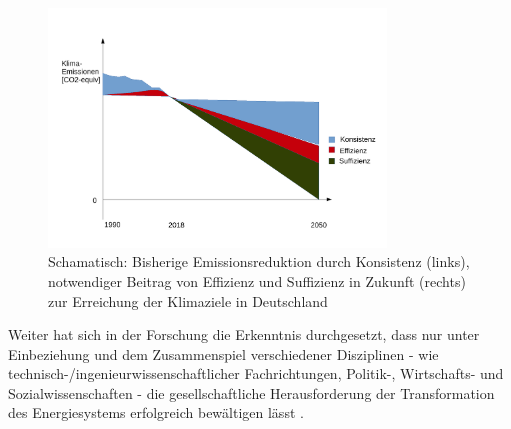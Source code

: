 \documentclass[a4paper,11pt,twoside]{scrartcl}
\begin{document}
\begin{figure}[!h]
    \centering
    \includegraphics[width=0.8\textwidth]{figures/Zusammenspiel2.pdf}
    \caption{Schamatisch: Bisherige Emissionsreduktion durch Konsistenz (links), notwendiger Beitrag von Effizienz und Suffizienz in Zukunft (rechts) zur Erreichung der Klimaziele in Deutschland}
    \label{fig:zusammenspiel}
\end{figure}

Weiter hat sich in der Forschung die Erkenntnis durchgesetzt, dass nur unter Einbeziehung und dem Zusammenspiel verschiedener Disziplinen - wie technisch-/ingenieurwissenschaftlicher Fachrichtungen, Politik-, Wirtschafts- und Sozialwissenschaften - die gesellschaftliche Herausforderung der Transformation des Energiesystems erfolgreich bewältigen lässt \cite{WGBU2012}.
\end{document}
